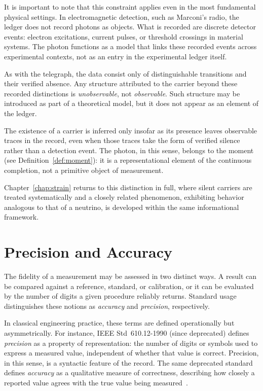 It is important to note that this constraint applies even in the most
fundamental physical settings. In electromagnetic detection, such as
Marconi's radio, the ledger does not record photons as objects. What is
recorded are discrete detector events: electron excitations, current pulses,
or threshold crossings in material systems. The photon functions as a model
that links these recorded events across experimental contexts, not as an
entry in the experimental ledger itself.

As with the telegraph, the data consist only of distinguishable
transitions and their verified absence. Any structure attributed to the
carrier beyond these recorded distinctions is \emph{unobservable}, not
\emph{observable}. Such structure may be introduced as part of a theoretical
model, but it does not appear as an element of the ledger.

The existence of a carrier is inferred only insofar as its presence leaves
observable traces in the record, even when those traces take the form of
verified silence rather than a detection event. The photon, in this sense,
belongs to the moment (see Definition~\ref{def:moment}): it is a representational element of the continuous
completion, not a primitive object of measurement.

Chapter~\ref{chap:strain} returns to this distinction in full, where silent 
carriers are treated
systematically and a closely related phenomenon, exhibiting behavior analogous
to that of a neutrino, is developed within the same informational framework.

\section{Precision and Accuracy}
\label{sec:precision-and-accuracy}

The fidelity of a measurement may be assessed in two distinct ways. A result can
be compared against a reference, standard, or calibration, or it can be
evaluated by the number of digits a given procedure reliably returns. Standard
usage distinguishes these notions as \emph{accuracy} and \emph{precision},
respectively.

In classical engineering practice, these terms are defined operationally but
asymmetrically. For instance, IEEE Std~610.12-1990 (since deprecated) defines 
\emph{precision} as a property of
representation: the number of digits or symbols used to express a measured
value, independent of whether that value is correct. Precision, in this sense,
is a syntactic feature of the record. The same deprecated standard defines
\emph{accuracy} as a qualitative measure of correctness, describing how closely
a reported value agrees with the true value being measured~\cite{ieee6101990}.


